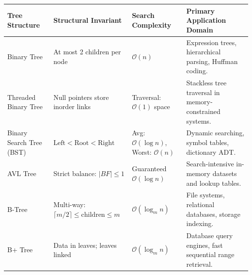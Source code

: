 \documentclass[12pt,a4paper]{article}
\renewcommand{\arraystretch}{1.45}
\begin{document}
\vspace{3pt}

\begin{tcolorbox}[tikzbox, title={\textbf{Summary Matrix: Comprehensive Comparison of Tree Data Structures}}]
\par\vspace{2pt}\noindent
\begingroup
\footnotesize
\setlength{\tabcolsep}{3.5pt}
\setlength{\extrarowheight}{1.5pt}
\renewcommand{\arraystretch}{1.15}
\begin{tabularx}{\linewidth}{|B{2.2cm}|B{3.2cm}|B{3.2cm}|Y|}
\hline
\textbf{Tree Structure} & \textbf{Structural Invariant} & \textbf{Search Complexity} & \textbf{Primary Application Domain} \\
\hline
Binary Tree & At most 2 children per node & $\mathcal{O}(n)$ & Expression trees, hierarchical parsing, Huffman coding. \\
\hline
Threaded Binary Tree & Null pointers store inorder links & Traversal: $\mathcal{O}(1)$ space & Stackless tree traversal in memory-constrained systems. \\
\hline
Binary Search Tree (BST) & $\text{Left} < \text{Root} < \text{Right}$ & Avg: $\mathcal{O}(\log n)$, Worst: $\mathcal{O}(n)$ & Dynamic searching, symbol tables, dictionary ADT. \\
\hline
AVL Tree & Strict balance: $|BF| \le 1$ & Guaranteed $\mathcal{O}(\log n)$ & Search-intensive in-memory datasets and lookup tables. \\
\hline
B-Tree & Multi-way: $\lceil m/2 \rceil \le \text{children} \le m$ & $\mathcal{O}(\log_m n)$ & File systems, relational databases, storage indexing. \\
\hline
B+ Tree & Data in leaves; leaves linked & $\mathcal{O}(\log_m n)$ & Database query engines, fast sequential range retrieval. \\
\hline
\end{tabularx}
\endgroup
\end{tcolorbox}
\end{document}
